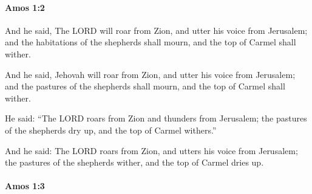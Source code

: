 		\paragraph{Amos 1:2} %
			\label{AMOS-1-2}

			And he said, The LORD will roar from Zion, and utter his voice from Jerusalem; and the habitations of the shepherds shall mourn, and the top of Carmel shall wither.

			\begin{versebox}
					\item[BHS] 
					\item[LXX] 
					\item[ASV] And he said, Jehovah will roar from Zion, and utter his voice from Jerusalem; and the pastures of the shepherds shall mourn, and the top of Carmel shall wither.
					\item[NIV] He said: “The LORD roars from Zion and thunders from Jerusalem; the pastures of the shepherds dry up, and the top of Carmel withers.”
					\item[NRSV] And he said: The LORD roars from Zion, and utters his voice from Jerusalem; the pastures of the shepherds wither, and the top of Carmel dries up.
			\end{versebox}

		\paragraph{Amos 1:3} %
			\label{AMOS-1-3}

